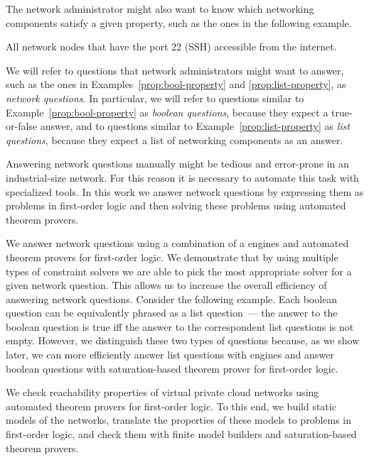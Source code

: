 The network administrator might also want to know which networking components satisfy a given property, such as the ones in the following example.
\begin{example}\label{prop:list-property}
All network nodes that have the port 22 (SSH) accessible from the internet.
\end{example}

We will refer to questions that network administrators might want to answer, such as the ones in Examples~\ref{prop:bool-property} and \ref{prop:list-property}, as \emph{network questions}. In particular, we will refer to questions similar to Example~\ref{prop:bool-property} as \emph{boolean questions}, because they expect a true-or-false answer, and to questions similar to Example~\ref{prop:list-property} as \emph{list questions}, because they expect a list of networking components as an answer.

Answering network questions manually might be tedious and error-prone in an industrial-size network. For this reason it is necessary to automate this task with specialized tools. In this work we answer network questions by expressing them as problems in first-order logic and then solving these problems using automated theorem provers.

We answer network questions using a combination of a \Datalog engines and automated theorem provers for first-order logic. We demonstrate that by using multiple types of constraint solvers we are able to pick the most appropriate solver for a given network question. This allows us to increase the overall efficiency of answering network questions. Consider the following example. Each boolean question can be equivalently phrased as a list question~--- the answer to the boolean question is true iff the answer to the correspondent list questions is not empty. However, we distinguish these two types of questions because, as we show later, we can more efficiently answer list questions with \Datalog engines and answer boolean questions with saturation-based theorem prover for first-order logic.


We check reachability properties of virtual private cloud networks using automated theorem provers for first-order logic. To this end, we build static models of the networks, translate the properties of these models to problems in first-order logic, and check them with finite model builders and saturation-based theorem provers.

